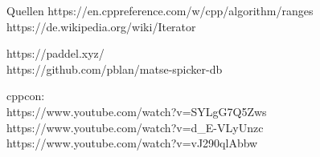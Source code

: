 \begin{frame}{Quellen}
    https://en.cppreference.com/w/cpp/algorithm/ranges \\
    https://de.wikipedia.org/wiki/Iterator

    \vspace{1em}

    https://paddel.xyz/ \\
    https://github.com/pblan/matse-spicker-db

    \vspace{1em}

    cppcon:\\
    https://www.youtube.com/watch?v=SYLgG7Q5Zws \\
    https://www.youtube.com/watch?v=d\_E-VLyUnzc \\
    https://www.youtube.com/watch?v=vJ290qlAbbw
\end{frame}